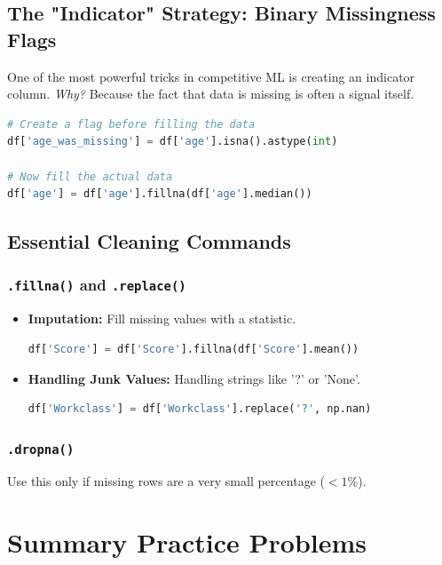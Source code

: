 \documentclass{article}
\begin{document}
\subsection{The "Indicator" Strategy: Binary Missingness Flags}
One of the most powerful tricks in competitive ML is creating an indicator column. 
\textit{Why?} Because the fact that data is missing is often a signal itself.

\begin{lstlisting}[language=Python]
# Create a flag before filling the data
df['age_was_missing'] = df['age'].isna().astype(int)

# Now fill the actual data
df['age'] = df['age'].fillna(df['age'].median())
\end{lstlisting}

\subsection{Essential Cleaning Commands}

\subsubsection{\texttt{.fillna()} and \texttt{.replace()}}
\begin{itemize}
    \item \textbf{Imputation:} Fill missing values with a statistic.
    \begin{lstlisting}[language=Python]
    df['Score'] = df['Score'].fillna(df['Score'].mean())
    \end{lstlisting}
    \item \textbf{Handling Junk Values:} Handling strings like '?' or 'None'.
    \begin{lstlisting}[language=Python]
    df['Workclass'] = df['Workclass'].replace('?', np.nan)
    \end{lstlisting}
\end{itemize}

\subsubsection{\texttt{.dropna()}}
Use this only if missing rows are a very small percentage ($< 1\%$).

\newpage

\section{Summary Practice Problems}
\end{document}
